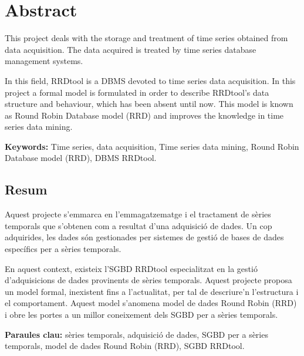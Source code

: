 

\chapter*{Abstract}

This project deals with the storage and treatment of time series obtained from data acquisition. The data acquired is treated by time series database management systems.

In this field, RRDtool is a DBMS devoted to time series data acquisition. In this project a formal model is formulated in order to describe RRDtool's data structure and behaviour, which has been absent until now. This model is known as Round Robin Database model (RRD) and improves the knowledge in time series data mining.


{\bfseries  Keywords:} Time series, data acquisition, Time series data mining, Round Robin Database model (RRD), DBMS  RRDtool. 



\section*{Resum}

Aquest projecte s'emmarca en l'emmagatzematge i el tractament de
sèries temporals que s'obtenen com a resultat d'una adquisició de
dades. Un cop adquirides, les dades són gestionades per sistemes de
gestió de bases de dades específics per a sèries temporals.

En aquest context, existeix l'SGBD RRDtool especialitzat en la gestió
d'adquisicions de dades provinents de sèries temporals. Aquest
projecte proposa un model formal, inexistent fins a l'actualitat, per
tal de descriure'n l'estructura i el comportament. Aquest model
s'anomena model de dades Round Robin (RRD) i obre les portes a
un millor coneixement dels SGBD per a sèries temporals.




{\bfseries Paraules clau:} sèries temporals, adquisició de dades, SGBD per a sèries temporals, model de dades Round Robin (RRD), SGBD RRDtool.














